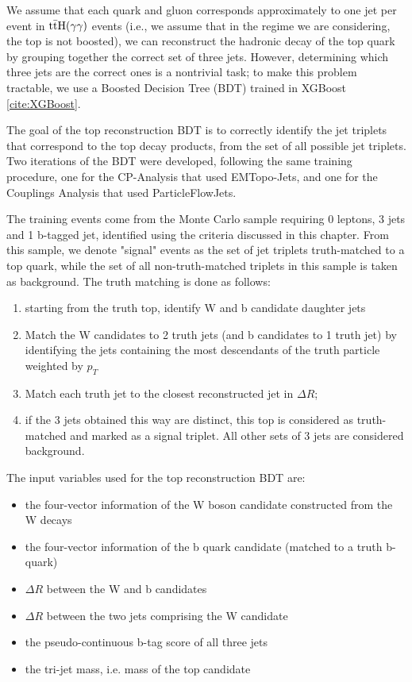 We assume that each quark and gluon corresponds approximately to one jet per event in $\mathrm{t\bar{t}H}(\gamma \gamma)$ events (i.e., we assume that in the regime we are considering, the top is not boosted), we can reconstruct the hadronic decay of the top quark by grouping together the correct set of three jets. However, determining which three jets are the correct ones is a nontrivial task; to make this problem tractable, we use a Boosted Decision Tree (BDT) trained in XGBoost \ref{cite:XGBoost}.

The goal of the top reconstruction BDT is to correctly identify the jet triplets that correspond to the top decay products, from the set of all possible jet triplets. Two iterations of the BDT were developed, following the same training procedure, one for the CP-Analysis that used EMTopo-Jets, and one for the Couplings Analysis that used ParticleFlowJets.

The training events come from the \ttH Monte Carlo sample requiring 0 leptons, 3 jets and 1 b-tagged jet, identified using the criteria discussed in this chapter. From this sample, we denote "signal" events as the set of jet triplets truth-matched to a top quark, while the set of all non-truth-matched triplets in this sample is taken as background. The truth matching is done as follows:

\begin{enumerate}
	\item starting from the truth top, identify W and b candidate daughter jets
	\item Match the W candidates to 2 truth jets (and b candidates to 1 truth jet) by identifying the jets containing the most descendants of the truth particle weighted by $p_{T}$
	\item Match each truth jet to the closest reconstructed jet in $\Delta R$;
	\item if the 3 jets obtained this way are distinct, this top is considered as truth-matched and marked as a signal triplet. All other sets of 3 jets are considered background.
\end{enumerate}

The input variables used for the top reconstruction BDT are:
\begin{itemize}
	\item the four-vector information of the W boson candidate constructed from the W decays
	\item the four-vector information of the b quark candidate (matched to a truth b-quark)
	\item $\Delta R$ between the W and b candidates
	\item $\Delta R$ between the two jets comprising the W candidate
	\item the pseudo-continuous b-tag score of all three jets
	\item the tri-jet mass, i.e. mass of the top candidate
\end{itemize}

